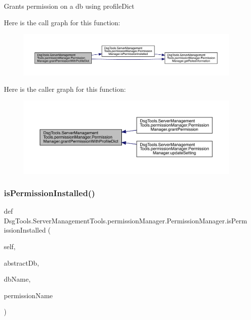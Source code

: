 \begin{DoxyVerb}Grants permission on a db using profileDict
\end{DoxyVerb}
 Here is the call graph for this function\+:
\nopagebreak
\begin{figure}[H]
\begin{center}
\leavevmode
\includegraphics[width=350pt]{class_dsg_tools_1_1_server_management_tools_1_1permission_manager_1_1_permission_manager_ac2a41f0388c97371d3e00f30e66519b6_cgraph}
\end{center}
\end{figure}
Here is the caller graph for this function\+:
\nopagebreak
\begin{figure}[H]
\begin{center}
\leavevmode
\includegraphics[width=350pt]{class_dsg_tools_1_1_server_management_tools_1_1permission_manager_1_1_permission_manager_ac2a41f0388c97371d3e00f30e66519b6_icgraph}
\end{center}
\end{figure}
\mbox{\label{class_dsg_tools_1_1_server_management_tools_1_1permission_manager_1_1_permission_manager_afa4a334bad05fec83bdcb570ac716aaa}} 
\subsubsection{\texorpdfstring{is\+Permission\+Installed()}{isPermissionInstalled()}}
{\footnotesize\ttfamily def Dsg\+Tools.\+Server\+Management\+Tools.\+permission\+Manager.\+Permission\+Manager.\+is\+Permission\+Installed (\begin{DoxyParamCaption}\item[{}]{self,  }\item[{}]{abstract\+Db,  }\item[{}]{db\+Name,  }\item[{}]{permission\+Name }\end{DoxyParamCaption})}

